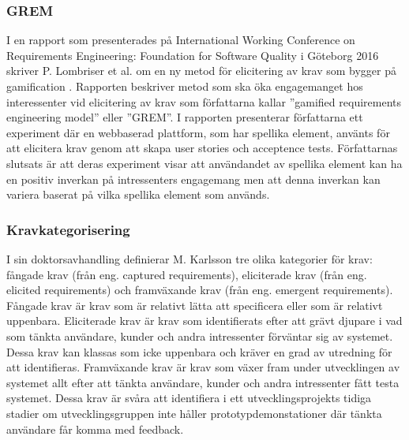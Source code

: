 \subsubsection{GREM}
I en rapport som presenterades på International Working Conference on Requirements Engineering: Foundation for Software Quality i Göteborg 2016 skriver P. Lombriser et al. \cite{lombriser2016gamified} om en ny metod för elicitering av krav som bygger på gamification . Rapporten beskriver metod som ska öka engagemanget hos interessenter vid elicitering av krav som författarna kallar ”gamified requirements engineering model” eller ”GREM”. I rapporten presenterar författarna ett experiment där en webbaserad plattform, som har spellika element, använts för att elicitera krav genom att skapa user stories och acceptence tests. Författarnas slutsats är att deras experiment visar att användandet av spellika element kan ha en positiv inverkan på intressenters engagemang men att denna inverkan kan variera baserat på vilka spellika element som används.

\subsubsection{Kravkategorisering}
I sin doktorsavhandling definierar M. Karlsson tre olika kategorier för krav: fångade krav (från eng. captured requirements), eliciterade krav (från eng. elicited requirements) och framväxande krav (från eng. emergent requirements)\cite{lkp.26083619960101}. Fångade krav är krav som är relativt lätta att specificera eller som är relativt uppenbara. Eliciterade krav är krav som identifierats efter att grävt djupare i vad som tänkta användare, kunder och andra intressenter förväntar sig av systemet. Dessa krav kan klassas som icke uppenbara och kräver en grad av utredning för att identifieras. Framväxande krav är krav som växer fram under utvecklingen av systemet allt efter att tänkta användare, kunder och andra intressenter fått testa systemet. Dessa krav är svåra att identifiera i ett utvecklingsprojekts tidiga stadier om utvecklingsgruppen inte håller prototypdemonstationer där tänkta användare får komma med feedback. 
 
